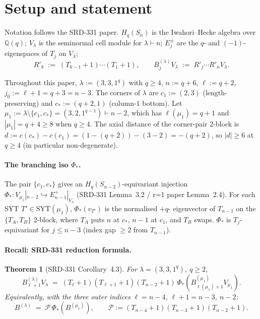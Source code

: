\documentclass[11pt]{article}
\newtheorem{theorem}{Theorem}
\theoremstyle{definition}
\begin{document}
\section{Setup and statement}\label{sec:setup}

Notation follows the SRD-331 paper. $H_q(S_n)$ is the
Iwahori--Hecke algebra over $\mathbb{Q}(q)$; $V_\lambda$ is the
seminormal cell module for $\lambda \vdash n$; $E_j^\pm$ are the
$q$- and $(-1)$-eigenspaces of $T_j$ on $V_\lambda$;
\[
   R'_k \;:=\; (T_{k-1}{+}1)\cdots(T_1{+}1),
   \qquad
   B^{(\lambda)}_j V_\lambda \;:=\; R'_j\cdots R'_n V_\lambda.
\]

Throughout this paper, $\lambda := (3, 3, 1^q)$ with $q \ge 4$,
$n := q + 6$, $\ell := q + 2$, $j_0 := \ell + 1 = q + 3 = n - 3$.
The corners of $\lambda$ are $c_1 := (2, 3)$ (length-preserving) and
$c_* := (q+2, 1)$ (column-$1$ bottom). Let
$\mu_1 := \lambda \setminus \{c_1, c_*\} = (3, 2, 1^{q-1}) \vdash n - 2$,
which has $\ell(\mu_1) = q + 1$ and $|\mu_1| = q + 4 \ge 8$ when
$q \ge 4$. The axial distance of the corner-pair $2$-block is
$d := c(c_*) - c(c_1) = (1 - (q+2)) - (3 - 2) = -(q + 2)$, so
$|d| \ge 6$ at $q \ge 4$ (in particular non-degenerate).

\paragraph{The branching iso $\Phi_*$.}
The pair $\{c_1, c_*\}$ gives an $H_q(S_{n-2})$-equivariant injection
$\Phi_* : V_{\mu_1}|_{n-2} \hookrightarrow E_{n-1}^+|_{V_\lambda}$
(SRD-331 Lemma~3.2 / r=1 paper Lemma~2.4). For each SYT $T' \in
\mathrm{SYT}(\mu_1)$, $\Phi_*(v_{T'})$ is the normalised $+q$-
eigenvector of $T_{n-1}$ on the $\{T_A, T_B\}$ $2$-block, where $T_A$
puts $n$ at $c_*$, $n-1$ at $c_1$, and $T_B$ swaps. $\Phi_*$ is
$T_j$-equivariant for $j \le n - 3$ (index gap $\ge 2$ from $T_{n-1}$).

\paragraph{Recall: SRD-331 reduction formula.}
\begin{theorem}[SRD-331 Corollary~4.3]\label{thm:reduction}
For $\lambda = (3, 3, 1^q)$, $q \ge 2$,
\begin{equation}\label{eq:reduction}
   B_{\ell+1}^{(\lambda)} V_\lambda
   \;=\;
   (T_\ell{+}1)(T_{\ell+1}{+}1)(T_{n-2}{+}1)\,
   \Phi_*\!\left(B_{\ell(\mu_1)+1}^{(\mu_1)} V_{\mu_1}\right).
\end{equation}
Equivalently, with the three outer indices $\ell = n-4$,
$\ell+1 = n-3$, $n-2$:
\[
   B^{(\lambda)} \;=\; \mathcal{P}\, \Phi_*(B^{(\mu_1)}),
   \qquad
   \mathcal{P} := (T_{n-4}{+}1)(T_{n-3}{+}1)(T_{n-2}{+}1).
\]
\end{theorem}
\end{document}

